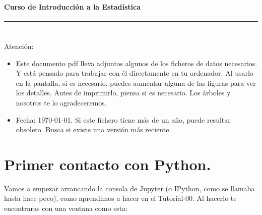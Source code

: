 \documentclass[10pt,a4paper]{article}\usepackage[]{graphicx}\usepackage[]{color}
\newcounter {cont01}
\begin{document}

\paragraph{\hspace{6.3cm}Curso de Introducción a la Estadística\\[2mm]} \noindent\hrule

\setcounter{section}{0}
\section*{\hspace{-0.1cm}}

Atención:
{\small
\begin{itemize}
  \item Este documento pdf lleva adjuntos algunos de los ficheros de datos necesarios. Y está pensado para trabajar con él directamente en tu ordenador. Al usarlo en la pantalla, si es necesario, puedes aumentar alguna de las figuras para ver los detalles. Antes de imprimirlo, piensa si es necesario. Los árboles y nosotros te lo agradeceremos.
  \item Fecha: \today. Si este fichero tiene más de un año, puede resultar obsoleto. Busca si existe una versión más reciente.
\end{itemize}


{\small
\setcounter{tocdepth}{1}
\tableofcontents
}
}

\section{Primer contacto con Python.}
\label{tut02:sec:PrimerContactoPython}

Vamos a empezar arrancando la consola de Jupyter (o IPython, como se llamaba hasta hace poco), como aprendimos a hacer en el Tutorial-00.   Al hacerlo te encontraras con una ventana como esta:
\end{document}
